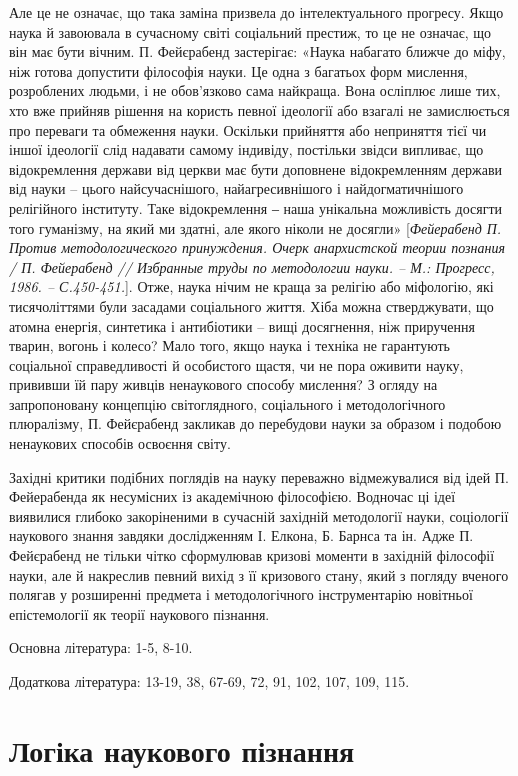 Але це не означає, що така заміна призвела до інтелектуального прогресу.
Якщо наука й завоювала в сучасному світі соціальний престиж, то це не
означає, що він має бути вічним. П. Фейєрабенд застерігає: «Наука набагато
ближче до міфу, ніж готова допустити філософія науки. Це одна з багатьох
форм мислення, розроблених людьми, і не обов’язково сама найкраща. Вона
осліплює лише тих, хто вже прийняв рішення на користь певної ідеології або
взагалі не замислюється про переваги та обмеження науки. Оскільки прийняття
або неприняття тієї чи іншої ідеології слід надавати самому індивіду, постільки
звідси випливає, що відокремлення держави від церкви має бути доповнене
відокремленням держави від науки – цього найсучаснішого, найагресивнішого і
найдогматичнішого релігійного інституту. Таке відокремлення ‒ наша
унікальна можливість досягти того гуманізму, на який ми здатні, але якого
ніколи не досягли» [\textit{Фейерабенд П. Против методологического принуждения.
Очерк анархистской теории познания / П. Фейерабенд // Избранные труды по
методологии науки. – М.: Прогресс, 1986. – С.450-451.}]. Отже, наука нічим не
краща за релігію або міфологію, які тисячоліттями були засадами соціального
життя. Хіба можна стверджувати, що атомна енергія, синтетика і антибіотики –
вищі досягнення, ніж приручення тварин, вогонь і колесо? Мало того, якщо
наука і техніка не гарантують соціальної справедливості й особистого щастя, чи
не пора оживити науку, прививши їй пару живців ненаукового способу
мислення? З огляду на запропоновану концепцію світоглядного, соціального і
методологічного плюралізму, П. Фейєрабенд закликав до перебудови науки за
образом і подобою ненаукових способів освоєння світу.

Західні критики подібних поглядів на науку переважно відмежувалися від
ідей П. Фейерабенда як несумісних із академічною філософією. Водночас ці
ідеї виявилися глибоко закоріненими в сучасній західній методології науки,
соціології наукового знання завдяки дослідженням І. Елкона, Б. Барнса та ін.
Адже П. Фейєрабенд не тільки чітко сформулював кризові моменти в західній
філософії науки, але й накреслив певний вихід з її кризового стану, який з
погляду вченого полягав у розширенні предмета і методологічного
інструментарію новітньої епістемології як теорії наукового пізнання.

Основна література: 1-5, 8-10.

Додаткова література: 13-19, 38, 67-69, 72, 91, 102, 107, 109, 115.

\section{Логіка наукового пізнання}

